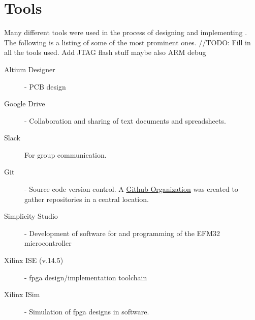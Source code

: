 \chapter{Tools}

Many different tools were used in the process of designing and implementing \vthreek.
The following is a listing of some of the most prominent ones.
//TODO: Fill in all the tools used. Add JTAG flash stuff maybe also ARM debug

\begin{description}
    \item[Altium Designer] - \gls{PCB} design
    \item[Google Drive] - Collaboration and sharing of text documents and spreadsheets.
    \item[Slack] For group communication.
    \item[Git] - Source code version control. A \href{https://github.com/DMPRO-2015-vector-graphics}{Github Organization} was created to gather repositories in a central location.
    \item[Simplicity Studio] - Development of software for and programming of the EFM32 microcontroller
    \item[Xilinx ISE (v.14.5)] - \gls{fpga} design/implementation toolchain
    \item[Xilinx ISim] - Simulation of \gls{fpga} designs in software.
\end{description}
